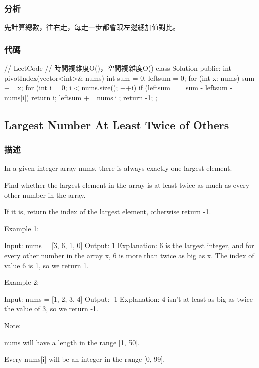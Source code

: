 \subsubsection{分析}
先計算總數，往右走，每走一步都會跟左邊總加值對比。

\subsubsection{代碼}
\begin{Code}
// LeetCode
// 時間複雜度O()，空間複雜度O()
class Solution {
public:
    int pivotIndex(vector<int>& nums) {
        int sum = 0, leftsum = 0;
        for (int x: nums) sum += x;
        for (int i = 0; i < nums.size(); ++i) {
            if (leftsum == sum - leftsum - nums[i]) return i;
            leftsum += nums[i];
        }
        return -1;
    }
};
\end{Code}


\subsection{Largest Number At Least Twice of Others}
\label{sec:largest-number-at-least-twice-of-others}

\subsubsection{描述}
In a given integer array nums, there is always exactly one largest element.

Find whether the largest element in the array is at least twice as much as every other number in the array.

If it is, return the index of the largest element, otherwise return -1.

Example 1:
\begin{Code}
Input: nums = [3, 6, 1, 0]
Output: 1
Explanation: 6 is the largest integer, and for every other number in the array x,
6 is more than twice as big as x.  The index of value 6 is 1, so we return 1.
\end{Code}

Example 2:
\begin{Code}
Input: nums = [1, 2, 3, 4]
Output: -1
Explanation: 4 isn't at least as big as twice the value of 3, so we return -1.
\end{Code}

Note:
\begindot
\item nums will have a length in the range [1, 50].
\item Every nums[i] will be an integer in the range [0, 99].
\myenddot


